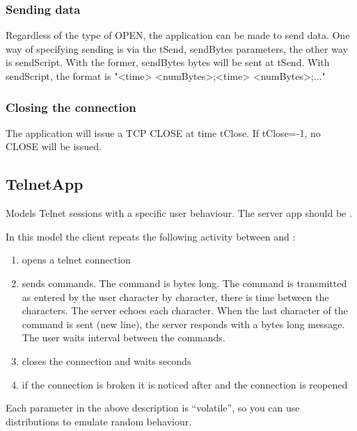 \subsubsection*{Sending data}

Regardless of the type of OPEN, the application can be made to send
data. One way of specifying sending is via the tSend, sendBytes
parameters, the other way is sendScript. With the former, sendBytes
bytes will be sent at tSend. With sendScript, the format is
"<time> <numBytes>;<time> <numBytes>;..."

\subsubsection*{Closing the connection}

The application will issue a TCP CLOSE at time tClose. If tClose=-1, no
CLOSE will be issued.



\subsection{TelnetApp}

Models Telnet sessions with a specific user behaviour.
The server app should be .

In this model the client repeats the following activity
between  and :

\begin{enumerate}
\item opens a telnet connection
\item sends  commands. The command is  bytes
      long. The command is transmitted as entered by the user character by character,
      there is  time between the characters. The server echoes
      each character. When the last character of the command is sent (new line),
      the server responds with a  bytes long message.
      The user waits  interval between the commands.
\item closes the connection and waits  seconds
\item if the connection is broken it is noticed after 
      and the connection is reopened
\end{enumerate}

Each parameter in the above description is ``volatile'', so you can
use distributions to emulate random behaviour.

